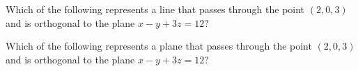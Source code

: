 \documentclass{ximera}
\author{Jim Talamo}
\begin{document}
\begin{exercise}
Which of the following represents a line that passes through the point $(2,0,3)$ and is orthogonal to the plane $x-y+3z=12$?

\begin{multipleChoice}
\end{multipleChoice}

Which of the following represents a plane that passes through the point $(2,0,3)$ and is orthogonal to the plane $x-y+3z=12$?

\begin{multipleChoice}
\end{multipleChoice}

\end{exercise}
\end{document}
